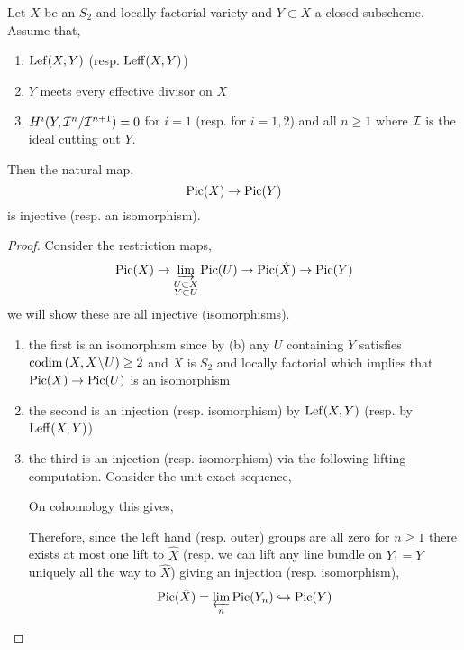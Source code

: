 \documentclass[12pt]{article}
\begin{document}
\begin{theorem}
Let $X$ be an $S_2$ and locally-factorial variety and $Y \subset X$ a closed subscheme. Assume that,
\begin{enumerate}
\item $\mathrm{Lef}(X, Y)$ (resp. $\mathrm{Leff}(X,Y)$)
\item $Y$ meets every effective divisor on $X$
\item $H^i(Y, \mathcal{I}^n / \mathcal{I}^{n+1}) = 0$ for $i = 1$ (resp. for $i = 1,2$) and all $n \ge 1$ where $\mathcal{I}$ is the ideal cutting out $Y$.
\end{enumerate}
Then the natural map,
\[ \mathrm{Pic}(X) \to \mathrm{Pic}(Y) \]
is injective (resp. an isomorphism).
\end{theorem}

\begin{proof}
Consider the restriction maps,
\[ \mathrm{Pic}(X) \to \operatorname*{\varinjlim}_{\substack{U \subset X \\ Y \subset U}} \mathrm{Pic}(U) \to \mathrm{Pic}(\hat{X}) \to \mathrm{Pic}(Y) \]
we will show these are all injective (isomorphisms). 
\begin{enumerate}
\item the first is an isomorphism since by (b) any $U$ containing $Y$ satisfies $\mathrm{codim}\left( X,X \! \setminus \! U \right) \ge 2$ and $X$ is $S_2$ and locally factorial which implies that $\mathrm{Pic}(X) \to \mathrm{Pic}(U)$ is an isomorphism

\item the second is an injection (resp. isomorphism) by $\mathrm{Lef}(X,Y)$ (resp. by $\mathrm{Leff}(X,Y)$)
\item the third is an injection (resp. isomorphism) via the following lifting computation. Consider the unit exact sequence,
\begin{center}
\end{center}
On cohomology this gives,
\begin{center}
\end{center}
Therefore, since the left hand (resp. outer) groups are all zero for $n \ge 1$ there exists at most one lift to $\hat{X}$ (resp. we can lift any line bundle on $Y_1 = Y$ uniquely all the way to $\hat{X}$) giving an injection (resp. isomorphism),
\[ \mathrm{Pic}(\hat{X}) = \operatorname*{\varprojlim}_n \mathrm{Pic}(Y_n) \hookrightarrow \mathrm{Pic}(Y) \]
\end{enumerate}
\end{proof}
\end{document}
